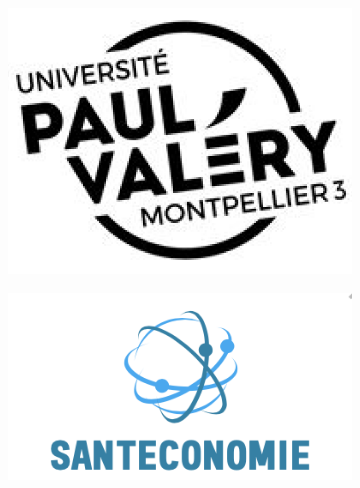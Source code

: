 \documentclass[12pt,a4paper]{report}
\begin{document}
\begin{titlepage}

\begin{center}
\begin{figure}[h]
    \centering
    \begin{subfigure}{0.3\textwidth}
        \centering
        \includegraphics[width=\linewidth]{images/Logo_univ.png}

    \end{subfigure}
    \hspace{3cm}
    \begin{subfigure}{0.4\textwidth}
        \centering
        \includegraphics[width=\linewidth]{images/Logo_SanEconomie.png}
    \end{subfigure}
    \label{fig:images}
\end{figure}


\end{center}
\end{titlepage}
\end{document}
